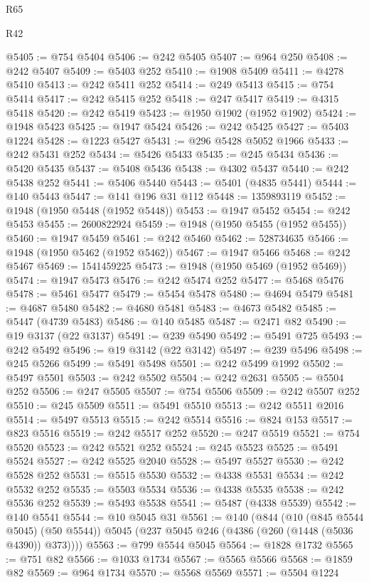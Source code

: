 \begin{lexlean}{R65}
\begin{lexlean}{R42}
\begin{coremodule}
{{{{{{{{{{{{{{{{{{{{{{{{{{{{{{{{{{{{{{{{{{{{{{{{{{{{{{{{{{{{{{{{{{{{{{{{{{{{{{{{{{{{{{{{{{{{{{{{{{{{{{{{{{{{{{{{{{{{{{{{{{{{{{{{{{{{{{{{{{{{{{{{{{{{{{{{{{{{{{{{{{{{{{{{{{{{{{{{{{{{{{{{@5405 := @754 @5404
@5406 := @242 @5405
@5407 := @964 @250
@5408 := @242 @5407
@5409 := @5403 @252
@5410 := @1908 @5409
@5411 := @4278 @5410
@5413 := @242 @5411 @252
@5414 := @249 @5413
@5415 := @754 @5414
@5417 := @242 @5415 @252
@5418 := @247 @5417
@5419 := @4315 @5418
@5420 := @242 @5419
@5423 := @1950 @1902 (@1952 @1902)
@5424 := @1948 @5423
@5425 := @1947 @5424
@5426 := @242 @5425
@5427 := @5403 @1224
@5428 := @1223 @5427
@5431 := @296 @5428 @5052 @1966
@5433 := @242 @5431 @252
@5434 := @5426 @5433
@5435 := @245 @5434
@5436 := @5420 @5435
@5437 := @5408 @5436
@5438 := @4302 @5437
@5440 := @242 @5438 @252
@5441 := @5406 @5440
@5443 := @5401 (@4835 @5441)
@5444 := @140 @5443
@5447 := @141 @196 @31 @112
@5448 := 1359893119
@5452 := @1948 (@1950 @5448 (@1952 @5448))
@5453 := @1947 @5452
@5454 := @242 @5453
@5455 := 2600822924
@5459 := @1948 (@1950 @5455 (@1952 @5455))
@5460 := @1947 @5459
@5461 := @242 @5460
@5462 := 528734635
@5466 := @1948 (@1950 @5462 (@1952 @5462))
@5467 := @1947 @5466
@5468 := @242 @5467
@5469 := 1541459225
@5473 := @1948 (@1950 @5469 (@1952 @5469))
@5474 := @1947 @5473
@5476 := @242 @5474 @252
@5477 := @5468 @5476
@5478 := @5461 @5477
@5479 := @5454 @5478
@5480 := @4694 @5479
@5481 := @4687 @5480
@5482 := @4680 @5481
@5483 := @4673 @5482
@5485 := @5447 (@4739 @5483)
@5486 := @140 @5485
@5487 := @2471 @82
@5490 := @19 @3137 (@22 @3137)
@5491 := @239 @5490
@5492 := @5491 @725
@5493 := @242 @5492
@5496 := @19 @3142 (@22 @3142)
@5497 := @239 @5496
@5498 := @245 @5266
@5499 := @5491 @5498
@5501 := @242 @5499 @1992
@5502 := @5497 @5501
@5503 := @242 @5502
@5504 := @242 @2631
@5505 := @5504 @252
@5506 := @247 @5505
@5507 := @754 @5506
@5509 := @242 @5507 @252
@5510 := @245 @5509
@5511 := @5491 @5510
@5513 := @242 @5511 @2016
@5514 := @5497 @5513
@5515 := @242 @5514
@5516 := @824 @153
@5517 := @823 @5516
@5519 := @242 @5517 @252
@5520 := @247 @5519
@5521 := @754 @5520
@5523 := @242 @5521 @252
@5524 := @245 @5523
@5525 := @5491 @5524
@5527 := @242 @5525 @2040
@5528 := @5497 @5527
@5530 := @242 @5528 @252
@5531 := @5515 @5530
@5532 := @4338 @5531
@5534 := @242 @5532 @252
@5535 := @5503 @5534
@5536 := @4338 @5535
@5538 := @242 @5536 @252
@5539 := @5493 @5538
@5541 := @5487 (@4338 @5539)
@5542 := @140 @5541
@5544 := @10 @5045 @31
@5561 := @140
    (@844
      (@10 (@845 @5544 @5045) (@50 @5544))
      @5045
      (@237 @5045 @246 (@4386 (@260 (@1448 (@5036 @4390)) @373))))
@5563 := @799 @5544 @5045
@5564 := @1828 @1732
@5565 := @751 @82
@5566 := @1033 @1734
@5567 := @5565 @5566
@5568 := @1859 @82
@5569 := @964 @1734
@5570 := @5568 @5569
@5571 := @5504 @1224
}}}}}}}}}}}}}}}}}}}}}}}}}}}}}}}}}}}}}}}}}}}}}}}}}}}}}}}}}}}}}}}}}}}}}}}}}}}}}}}}}}}}}}}}}}}}}}}}}}}}}}}}}}}}}}}}}}}}}}}}}}}}}}}}}}}}}}}}}}}}}}}}}}}}}}}}}}}}}}}}}}}}}}}}}}}}}}}}}}}}}}}}
\end{coremodule}
\end{lexlean}
\end{lexlean}
